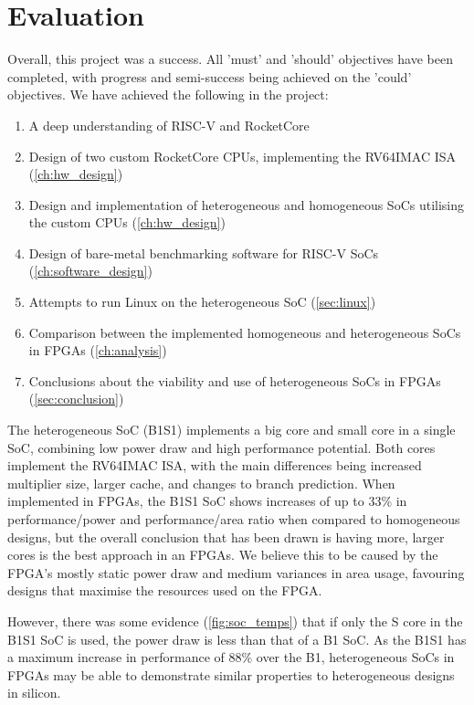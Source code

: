 \chapter{Evaluation}
\label{ch:evaluation}
Overall, this project was a success. All 'must' and 'should' objectives have been completed, with progress and semi-success being achieved on the 'could' objectives. We have achieved the following in the project:

\begin{enumerate}
    \item A deep understanding of RISC-V and RocketCore
    \item Design of two custom RocketCore CPUs, implementing the RV64IMAC ISA (\ref{ch:hw_design})
    \item Design and implementation of heterogeneous and homogeneous SoCs utilising the custom CPUs (\ref{ch:hw_design})
    \item Design of bare-metal benchmarking software for RISC-V SoCs (\ref{ch:software_design})
    \item Attempts to run Linux on the heterogeneous SoC (\ref{sec:linux})
    \item Comparison between the implemented homogeneous and heterogeneous SoCs in FPGAs (\ref{ch:analysis})
    \item Conclusions about the viability and use of heterogeneous SoCs in FPGAs (\ref{sec:conclusion})
\end{enumerate}

The heterogeneous SoC (B1S1) implements a big core and small core in a single SoC, combining low power draw and high performance potential. Both cores implement the RV64IMAC ISA, with the main differences being increased multiplier size, larger cache, and changes to branch prediction. When implemented in FPGAs, the B1S1 SoC shows increases of up to 33\% in performance/power and performance/area ratio when compared to homogeneous designs, but the overall conclusion that has been drawn is having more, larger cores is the best approach in an FPGAs. We believe this to be caused by the FPGA's mostly static power draw and medium variances in area usage, favouring designs that maximise the resources used on the FPGA.

However, there was some evidence (\ref{fig:soc_temps}) that if only the S core in the B1S1 SoC is used, the power draw is less than that of a B1 SoC. As the B1S1 has a maximum increase in performance of 88\% over the B1, heterogeneous SoCs in FPGAs may be able to demonstrate similar properties to heterogeneous designs in silicon.

